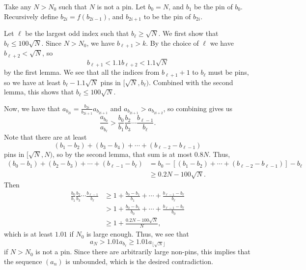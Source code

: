 Take any $N>N_0$ such that $N$ is not a pin. Let $b_0=N$, and $b_1$ be the pin
of $b_0$. Recursively define $b_{2i}=f(b_{2i-1})$, and $b_{2i+1}$ to be the pin of $b_{2i}$.

Let $\ell$ be the largest odd index such that $b_\ell\ge\sqrt{N}$. We first show
that $b_\ell\le 100\sqrt{N}$. Since $N > N_0$, we have $b_{\ell+1} > k$. By the
choice of $\ell$ we have $b_{\ell+2}<\sqrt{N}$, so \[b_{\ell+1}<1.1b_{\ell+2}<
1.1\sqrt{N}\] by the first lemma. We see
that all the indices from $b_{\ell+1}+1$ to $b_\ell$ must be pins, so we have
at least $b_\ell-1.1\sqrt{N}$ pins in $[\sqrt{N},b_\ell)$. Combined with the
second lemma, this shows that $b_\ell\le 100\sqrt{N}$.

Now, we have that $a_{b_{2i}}=\tfrac{b_{2i}}{b_{2i+1}}a_{b_{2i+1}}$ and
$a_{b_{2i+1}}> a_{b_{2i+2}}$, so combining gives us
\[\frac{a_{b_0}}{a_{b_\ell}}> \frac{b_0}{b_1}\frac{b_2}{b_3}\dotsm\frac{b_{\ell-1}}{b_\ell}.\]
Note that there are at least
\[(b_1-b_2)+(b_3-b_4)+\dotsb+(b_{\ell-2}-b_{\ell-1})\]
pins in $[\sqrt{N},N)$, so by the second lemma, that sum is at most $0.8N$. Thus,
\begin{align*}
  (b_0-b_1)+(b_2-b_3)+\dotsb+(b_{\ell-1}-b_\ell)
  &=b_0-[(b_1-b_2)+\dotsb + (b_{\ell-2}-b_{\ell-1})]-b_\ell
  \\ &\ge 0.2N-100\sqrt{N}.
\end{align*}
Then
\begin{align*}
\frac{b_0}{b_1}\frac{b_2}{b_3}\dotsm
\frac{b_{\ell-1}}{b_\ell} &\ge 1+\frac{b_0-b_1}{b_1}+\dotsb+\frac{b_{\ell-1}-b_\ell}{b_\ell} \\
&> 1 +\frac{b_0-b_1}{b_0} + \dotsb +
\frac{b_{\ell-1}-b_{\ell}}{b_0} \\
&\ge 1+\frac{0.2N-100\sqrt{N}}{N},
\end{align*}
which is at least $1.01$ if $N_0$ is large enough. Thus, we see that
\[a_N>1.01 a_{b_{\ell}} \geq 1.01 a_{\lfloor\sqrt{N}\rfloor}\]
if $N>N_0$ is not a pin. Since there are arbitrarily large non-pins, this implies that the sequence $(a_n)$ is unbounded, which is the desired contradiction.
